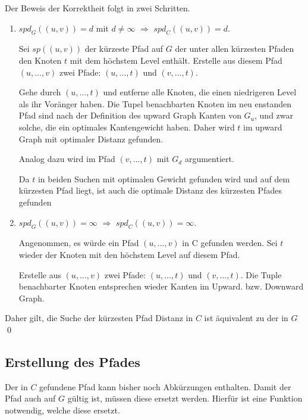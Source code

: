 \begin{beweis}\label{ch:proof:correct}
    Der Beweis der Korrektheit folgt in zwei Schritten.

    \begin{enumerate}
        \item
              ${spd}_G ((u, v)) = d$ mit $d \neq \infty$ $\Rightarrow$ ${spd}_C((u, v)) = d$.

              Sei ${sp}((u, v))$ der kürzeste Pfad auf $G$ der unter allen kürzesten Pfaden den Knoten $t$ mit dem höchstem Level enthält.
              Erstelle aus diesem Pfad $(u, \dotsc, v)$ zwei Pfade: $(u, \dotsc, t)$ und $(v, \dotsc, t)$.

              Gehe durch $(u, \dotsc, t)$ und entferne alle Knoten, die einen niedrigeren Level als ihr Voränger haben.
              Die Tupel benachbarten Knoten im neu enstanden Pfad sind nach der Definition des upward Graph Kanten von $G_u$, und zwar solche, die ein optimales Kantengewicht haben.
              Daher wird $t$ im upward Graph mit optimaler Distanz gefunden.

              Analog dazu wird im Pfad $(v, \dotsc, t)$ mit $G_d$ argumentiert.

              Da $t$ in beiden Suchen mit optimalen Gewicht gefunden wird und auf dem kürzesten Pfad liegt, ist auch die optimale Distanz des kürzesten Pfades gefunden

        \item
              ${spd}_G ((u, v)) = \infty$ $\Rightarrow$ ${spd}_C((u, v)) = \infty$.

              Angenommen, es würde ein Pfad $(u, \dotsc, v)$ in C gefunden werden.
              Sei $t$ wieder der Knoten mit den höchstem Level auf diesem Pfad.

              Erstelle aus $(u, \dotsc, v)$ zwei Pfade: $(u, \dotsc, t)$ und $(v, \dotsc, t)$.
              Die Tuple benachbarter Knoten entsprechen wieder Kanten im Upward. bzw. Downward Graph.
    \end{enumerate}

    Daher gilt, die Suche der kürzesten Pfad Distanz in $C$ ist äquivalent zu der in $G$
    \qed
\end{beweis}

\subsection{Erstellung des Pfades}\label{ch:subsection:pfad_gewinnung}
Der in $C$ gefundene Pfad kann bisher noch Abkürzungen enthalten.
Damit der Pfad auch auf $G$ gültig ist, müssen diese ersetzt werden.
Hierfür ist eine Funktion notwendig, welche diese ersetzt.

